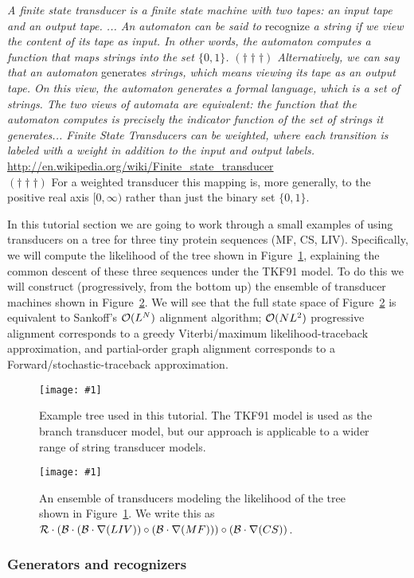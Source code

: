 \documentclass{article}
\newcommand{\figref}[1]{Figure~\ref{Figures.#1}}
\newcommand{\figlabel}[1]{\label{Figures.#1}}
\newcommand{\easyfig}[4]{
\begin{figure}
\texttt{[image: \#1]}
\caption{ \figlabel{#3} #4}
\end{figure}}
\newcommand{\pdffig}[2]{\easyfig{#1-fig.pdf}{}{#1}{#2}}
\newcommand\tkf{{\cal B}}
\newcommand\tkfroot{{\cal R}}
\newcommand\fork{\circ}
\newcommand\recognize{\nabla}
\begin{document}
{\em A finite state transducer is a finite state machine with two tapes: an input tape and an output tape. ... An automaton can be said to } recognize {\em a string if we view the content of its tape as input. In other words, the automaton computes a function that maps strings into the set $\{0,1\}$. $(\dagger\dagger\dagger)$ Alternatively, we can say that an automaton } generates {\em strings, which means viewing its tape as an output tape. On this view, the automaton generates a formal language, which is a set of strings. The two views of automata are equivalent: the function that the automaton computes is precisely the indicator function of the set of strings it generates... Finite State Transducers can be weighted, where each transition is labeled with a weight in addition to the input and output labels. }
\url{http://en.wikipedia.org/wiki/Finite_state_transducer}
\\
$(\dagger\dagger\dagger)$ For a weighted transducer this mapping is,
more generally, to the positive real axis $[0,\infty)$
rather than just the binary set $\{0,1\}$.

In this tutorial section we are going to work through a small examples of using transducers on a tree
for three tiny protein sequences (MF, CS, LIV).
Specifically, we will compute the likelihood of the tree shown in \figref{cs-mf-liv-tree},
explaining the common descent of these three sequences
under the TKF91 model.
To do this we will construct (progressively, from the bottom up) the ensemble of transducer machines shown in \figref{cs-mf-liv-machines}.
We will see that the full state space of \figref{cs-mf-liv-machines} is equivalent to Sankoff's ${\cal O}(L^N)$ alignment algorithm;
${\cal O}(NL^2)$ progressive alignment corresponds to a greedy Viterbi/maximum likelihood-traceback approximation,
and partial-order graph alignment corresponds to a Forward/stochastic-traceback approximation.

\pdffig{cs-mf-liv-tree}{Example tree used in this tutorial.  
The TKF91 model is used as the branch transducer model, but our approach 
is applicable to a wider range of string transducer models.  }

\pdffig{cs-mf-liv-machines}{An ensemble of transducers modeling the likelihood of the tree shown in \figref{cs-mf-liv-tree}.
We write this as $\tkfroot \cdot (\tkf \cdot (\tkf \cdot \recognize(LIV))\fork(\tkf \cdot \recognize(MF)))\fork(\tkf \cdot \recognize(CS))$. }

\subsubsection{Generators and recognizers}
\end{document}
